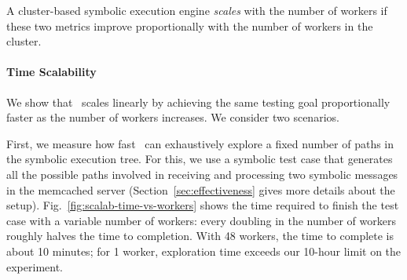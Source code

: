 

A cluster-based symbolic execution engine \emph{scales} with the number of workers if these two metrics improve proportionally with the number of workers in the cluster.

\paragraph{Time Scalability} We show that \cnine\ scales linearly by achieving the same testing goal proportionally faster as the number of workers increases. We consider two scenarios.

First, we measure how fast \cnine\ can exhaustively explore a fixed number of paths in the symbolic execution tree.  For this, we use a symbolic test case that generates all the possible paths involved in receiving and processing two symbolic messages in the memcached server (Section~\ref{sec:effectiveness} gives more details about the setup). Fig.~\ref{fig:scalab-time-vs-workers} shows the time required to finish the test case with a variable number of workers: every doubling in the number of workers roughly halves the time to completion.  With 48 workers, the time to complete is about 10 minutes; for 1 worker,  exploration time exceeds our 10-hour limit on the experiment.  



